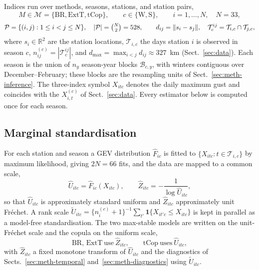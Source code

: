 Indices run over methods, seasons, stations, and station pairs,
\begin{equation}
  M\in\mathcal M=\{\mathrm{BR},\mathrm{ExtT},\mathrm{tCop}\},
  \qquad c\in\{\mathrm W,\mathrm S\},
  \qquad i=1,\dots,N,\quad N=33,
\end{equation}
\begin{equation}
  \mathcal P=\{(i,j):1\le i<j\le N\},\quad |\mathcal P|=\tbinom{N}{2}=528,
  \qquad
  d_{ij}=\lVert s_i-s_j\rVert,\quad
  \mathcal T^{ij}_c=\mathcal T_{i,c}\cap\mathcal T_{j,c},
\end{equation}
where \(s_i\in\mathbb R^2\) are the station locations, \(\mathcal T_{i,c}\) the days station \(i\) is observed in season \(c\), \(n^{(c)}_{ij}=|\mathcal T^{ij}_c|\), and \(d_{\max}=\max_{i<j}d_{ij}\approx327\)~km (Sect.~\ref{sec:data}). Each season is the union of \(n_y\) season-year blocks \(\mathcal B_{c,y}\), with winters contiguous over December--February; these blocks are the resampling units of Sect.~\ref{sec:meth-inference}. The three-index symbol \(X_{itc}\) denotes the daily maximum gust and coincides with the \(X^{(c)}_{i,t}\) of Sect.~\ref{sec:data}. Every estimator below is computed once for each season.

\subsection{Marginal standardisation}\label{sec:meth-marginals}

For each station and season a GEV distribution \(\widehat F_{ic}\) is fitted to \(\{X_{itc}:t\in\mathcal T_{i,c}\}\) by maximum likelihood, giving \(2N=66\) fits, and the data are mapped to a common scale,
\begin{equation}\label{eq:meth-standardisation}
  \widehat U_{itc}=\widehat F_{ic}(X_{itc}),
  \qquad
  \widehat Z_{itc}=-\frac{1}{\log \widehat U_{itc}},
\end{equation}
so that \(\widehat U_{itc}\) is approximately standard uniform and \(\widehat Z_{itc}\) approximately unit Fr\'echet. A rank scale \(\widetilde U_{itc}=\{n^{(c)}_i+1\}^{-1}\sum_{t'}\mathbf 1\{X_{it'c}\le X_{itc}\}\) is kept in parallel as a model-free standardisation. The two max-stable models are written on the unit-Fr\'echet scale and the copula on the uniform scale,
\begin{equation}
  \mathrm{BR},\,\mathrm{ExtT}\ \text{use}\ \widehat Z_{itc},
  \qquad
  \mathrm{tCop}\ \text{uses}\ \widehat U_{itc},
\end{equation}
with \(\widehat Z_{itc}\) a fixed monotone transform of \(\widehat U_{itc}\) and the diagnostics of Sects.~\ref{sec:meth-temporal} and~\ref{sec:meth-diagnostics} using \(\widetilde U_{itc}\).

